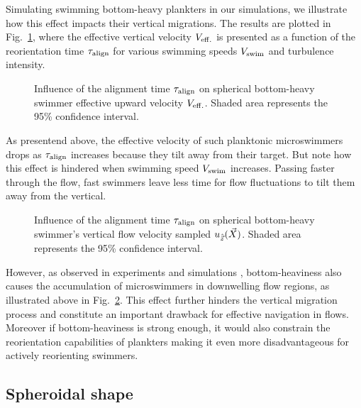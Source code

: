 Simulating swimming bottom-heavy plankters in our simulations, we illustrate how this effect impacts their vertical migrations.
The results are plotted in Fig.~\ref{fig:passive_reorientation_time}, where the effective vertical velocity $\Performance$ is presented as a function of the reorientation time $\ReorientationTime$ for various swimming speeds $V_{\mathrm{swim}}$ and turbulence intensity.
\begin{figure}%
	\centering
	
	\caption[Influence of the alignment time $\ReorientationTime$ on spherical bottom-heavy swimmer effective upward velocity $\Performance$.]{
		Influence of the alignment time $\ReorientationTime$ on spherical bottom-heavy swimmer effective upward velocity $\Performance$.
		Shaded area represents the 95\% confidence interval.
	}
	\label{fig:passive_reorientation_time}
\end{figure}
As presentend above, the effective velocity of such planktonic microswimmers drops as $\ReorientationTime$ increases because they tilt away from their target.
But note how this effect is hindered when swimming speed $V_{\mathrm{swim}}$ increases.
Passing faster through the flow, fast swimmers leave less time for flow fluctuations to tilt them away from the vertical.
\begin{figure}%
	\centering
	
	\caption[Influence of the alignment time $\ReorientationTime$ on spherical bottom-heavy swimmer's vertical flow velocity sampled $\FlowVelocityScalar_{\Direction}(\ParticlePosition)$.]{
		Influence of the alignment time $\ReorientationTime$ on spherical bottom-heavy swimmer's vertical flow velocity sampled $\FlowVelocityScalar_{\Direction}(\ParticlePosition)$.
		Shaded area represents the 95\% confidence interval.
	}
	\label{fig:bh_flow_sampled}
\end{figure}
However, as observed in experiments and simulations \citep{kessler1985hydrodynamic, durham2013turbulence}, bottom-heaviness also causes the accumulation of microswimmers in downwelling flow regions, as illustrated above in Fig.~\ref{fig:bh_flow_sampled}.
This effect further hinders the vertical migration process and constitute an important drawback for effective navigation in flows.
Moreover if bottom-heaviness is strong enough, it would also constrain the reorientation capabilities of plankters making it even more disadvantageous for actively reorienting swimmers.

\subsection{Spheroidal shape}\label{sec:spheroids}


